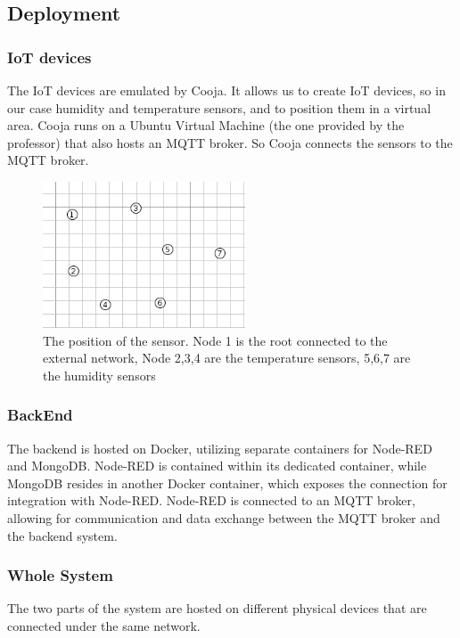 \documentclass[11pt]{article}
\begin{document}
\subsection{Deployment}
\subsubsection{IoT devices}

The IoT devices are emulated by Cooja. It allows us to create IoT devices, so in our case humidity and temperature sensors, and to position them in a virtual area.
Cooja runs on a Ubuntu Virtual Machine (the one provided by the professor) that also hosts an MQTT broker. So Cooja connects the sensors to the MQTT broker. 
\begin{figure}[H]
    \centering
    \includegraphics[width=6cm]{resources/Sensors_Position.png} 
    \caption{The position of the sensor. 
    Node 1 is the root connected to the external network, Node 2,3,4 are the temperature sensors, 5,6,7 are the humidity sensors}
\end{figure}
\subsubsection{BackEnd}
The backend is hosted on Docker, utilizing separate containers for Node-RED and MongoDB. Node-RED is contained within its dedicated container, while MongoDB resides in another Docker container, which exposes the connection for integration with Node-RED. Node-RED is connected to an MQTT broker, allowing for communication and data exchange between the MQTT broker and the backend system.

\subsubsection{Whole System}
The two parts of the system are hosted on different physical devices that are connected under the same network.
\end{document}
